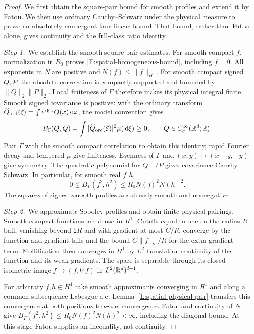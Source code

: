 \begin{proof}
  We first obtain the square-pair bound for smooth profiles and extend it by
  Fatou. We then use ordinary Cauchy–Schwarz under the physical measure to
  prove an absolutely convergent four-linear bound. That bound, rather than
  Fatou alone, gives continuity and the full-class ratio identity.


  \medskip
  \noindent\textit{Step 1.~}We establish the smooth square-pair estimates.
  For smooth compact $f$, normalization in $R_0$ proves
  \eqref{E:spatial-homogeneous-bound}, including $f = 0$. All exponents in $N$
  are positive and $N(f) \le \|f\|_{H^1}$. For smooth compact signed $Q,P$, the
  absolute correlation is compactly supported and bounded by $\|Q\|_2\|P\|_2$.
  Local finiteness of $\Gamma$ therefore makes its physical integral finite.
  Smooth signed covariance is positive: with the ordinary transform
  $\widehat{Q}_{\mathrm{ord}}(\xi) = \int e^{i\xi\cdot x}Q(x)\,\mathrm{d} x$, the model
  convention gives
  \[
    B_\Gamma(Q,Q)=\int|\widehat{Q}_{\mathrm{ord}}(\xi)|^2\mu(\,\mathrm{d}\xi)
    \ge0,\qquad Q\in C_c^\infty(\mathbb{R}^d;\mathbb{R}).
  \]
  Pair $\Gamma$ with the smooth compact correlation to obtain this identity;
  rapid Fourier decay and tempered $\mu$ give finiteness. Evenness of $\Gamma$
  and $(x,y)\mapsto(x-y,-y)$ give symmetry. The quadratic polynomial for $Q+tP$
  gives covariance Cauchy--Schwarz. In particular, for smooth real $f,h$,
  \[
    0\le B_\Gamma(f^2,h^2)
    \le R_0N(f)^2N(h)^2.
  \]
  The squares of signed smooth profiles are already smooth and nonnegative.


  \medskip
  \noindent\textit{Step 2.~}We approximate Sobolev profiles and obtain finite
  physical pairings.
  Smooth compact functions are dense in $H^1$. Cutoffs equal to one on the
  radius-$R$ ball, vanishing beyond $2R$ and with gradient at most $C/R$,
  converge by the function and gradient tails and the bound $C\|f\|_2/R$ for the
  extra gradient term. Mollification then converges in $H^1$ by $L^2$
  translation continuity of the function and its weak gradients. The space is
  separable through its closed isometric image $f\mapsto(f,\nabla f)$ in
  $L^2(\mathbb{R}^d)^{d+1}$.

  For arbitrary $f,h \in H^1$ take smooth approximants converging in $H^1$ and
  along a common subsequence Lebesgue-a.e. Lemma~\ref{L:spatial-physical-pair}
  transfers this convergence at both positions to $\nu$-a.e. convergence. Fatou
  and continuity of $N$ give $B_\Gamma(f^2,h^2) \le R_0N(f)^2N(h)^2 < \infty$,
  including the diagonal bound. At this stage Fatou supplies an inequality, not
  continuity.



\end{proof}
